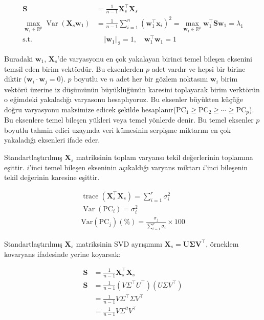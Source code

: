 \documentclass[12pt]{article}
\begin{document}
\begin{align*}
  \mathbf{S} &= \frac{1}{n-1}\mathbf{X}_s^\top\mathbf{X}_s \\[1em]
  \max_{\mathbf{w}_1 \in \mathbb{R}^p} \operatorname{Var}(\mathbf{X}_s\mathbf{w}_1) &= \frac{1}{n-1}\sum_{i=1}^{n} (\mathbf{w}_1^\top \mathbf{x}_i)^2 = \max_{\mathbf{w}_1 \in \mathbb{R}^p} \mathbf{w}_1^\top \mathbf{S} \mathbf{w}_1 = \lambda_1 \\[1em]
  \text{s.t.} &\quad \Vert \mathbf{w}_1 \Vert_2 = 1, \quad \mathbf{w}_1^\top \mathbf{w}_1 = 1
\end{align*}

Buradaki $\mathbf{w}_1$, $\mathbf{X}_s$'de varyasyonu en çok yakalayan birinci temel bileşen eksenini temsil eden birim vektördür. Bu eksenlerden $p$ adet vardır ve hepsi bir birine diktir ($\mathbf{w}_i \cdot \mathbf{w}_j=0$). $p$ boyutlu ve $n$ adet her bir gözlem noktasını $\mathbf{w}_i$ birim vektörü üzerine iz düşümünün büyüklüğünün karesini toplayarak birim verktörün o eğimdeki yakaladığı varyasonu hesaplıyoruz. Bu eksenler büyükten küçüğe doğru varyasyonu maksimize edicek şekilde hesaplanır($\text{PC}_1 \ge \text{PC}_2 \ge \cdots \ge \text{PC}_p$). Bu eksenlere temel bileşen yükleri veya temel yönlerde denir. Bu temel eksenler $p$ boyutlu tahmin edici uzayında veri kümesinin serpişme miktarını en çok yakaladığı eksenleri ifade eder.

\vspace{1.5em}

Standartlaştırılmış $\mathbf{X}_s$ matriksinin toplam varyansı tekil değerlerinin toplamına eşittir. $i$'inci temel bileşen ekseninin açıkaldığı varyans miktarı $i$'inci bileşenin tekil değerinin karesine eşittir.

\begin{gather*}
  \operatorname{trace}(\mathbf{X}_s^\top\mathbf{X}_s) = \sum_{i=1}^{r} \sigma_i^2 \\[1em]
  \operatorname{Var}(\text{PC}_i)=\sigma_i^2 \\[1em]
  \text{Var}(\text{PC}_j)(\%)=\frac{\sigma_j}{\sum_{i=1}^{p}\sigma_i}\times 100
\end{gather*}

Standartlaştırılmış $\mathbf{X}_s$ matriksinin SVD ayrışımını $\mathbf{X}_s = \mathbf{U\Sigma V^\top}$, örneklem kovaryans ifadesinde yerine koyarsak:

\begin{align*}
  \mathbf{S} &= \frac{1}{n-1}\mathbf{X}_s^\top\mathbf{X}_s \\[1em]
  \mathbf{S} &= \frac{1}{n-1}(V\Sigma^{\top}U^{\top})(U\Sigma V^{\top}) \\[1em]
               &=\frac{1}{n-1}V\Sigma^{\top}\Sigma V^{\top} \\[1em]
               &=\frac{1}{n-1}V\Sigma^2 V^{\top}
\end{align*}
\end{document}
